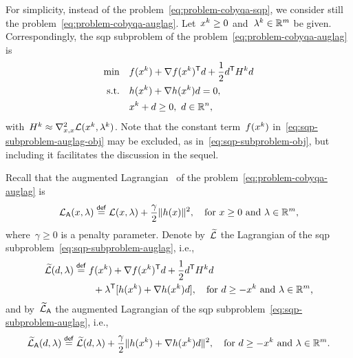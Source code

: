 For simplicity, instead of the problem~\cref{eq:problem-cobyqa-sqp}, we consider still the problem~\cref{eq:problem-cobyqa-auglag}.
Let~$\iter[k] \ge 0$ and~$\lm[k] \in \R^m$ be given.
Correspondingly, the \gls{sqp} subproblem of the problem~\cref{eq:problem-cobyqa-auglag} is
\begin{subequations}
    \label{eq:sqp-subproblem-auglag}
    \begin{align}
        \min        & \quad \obj(\iter[k]) + \nabla \obj(\iter[k])^{\T} \step + \frac{1}{2} \step^{\T} H^k \step \label{eq:sqp-subproblem-auglag-obj}\\
        \text{s.t.} & \quad h(\iter[k]) + \nabla h(\iter[k]) \step = 0,\\
                    & \quad \iter[k] + \step \ge 0, ~ \step \in \R^n,
    \end{align}
\end{subequations}
with~$H^k \approx \nabla_{x, x}^2 \lag(\iter[k], \lm[k])$.
Note that the constant term~$\obj(\iter[k])$ in~\cref{eq:sqp-subproblem-auglag-obj} may be excluded, as in~\cref{eq:sqp-subproblem-obj}, but including it facilitates the discussion in the sequel.

Recall that the augmented Lagrangian~\cite{Hestenes_1969,Powell_1969,Rockafellar_1973} of the problem~\cref{eq:problem-cobyqa-auglag} is
\begin{equation}
    \label{eq:augmented-lagrangian-inequality}
    \auglag(\iter, \lm) \eqdef \lag(\iter, \lm) + \frac{\gamma}{2} \norm{h(\iter)}^2, \quad \text{for~$\iter \ge 0$ and~$\lm \in \R^m$,}
\end{equation}
where~$\gamma \ge 0$ is a penalty parameter.
Denote by~$\lagalt$ the Lagrangian of the \gls{sqp} subproblem~\cref{eq:sqp-subproblem-auglag}, i.e.,
\begin{align*}
    \lagalt(\step, \lm) & \eqdef \obj(\iter[k]) + \nabla \obj(\iter[k])^{\T} \step + \frac{1}{2} \step^{\T} H^k \step\\
                        & \qquad + \lm^{\T} [h(\iter[k]) + \nabla h(\iter[k]) \step], \quad \text{for~$\step \ge -\iter[k]$ and~$\lm \in \R^m$,}
\end{align*}
and by~$\widetilde{\mathcal{L}}_{\mathsf{A}}$ the augmented Lagrangian of the \gls{sqp} subproblem~\cref{eq:sqp-subproblem-auglag}, i.e.,
\begin{equation*}
    \auglagalt(\step, \lm) \eqdef \lagalt(\step, \lm) + \frac{\gamma}{2} \norm{h(\iter[k]) + \nabla h(\iter[k]) \step}^2, \quad \text{for~$\step \ge -\iter[k]$ and~$\lm \in \R^m$.}
\end{equation*}

